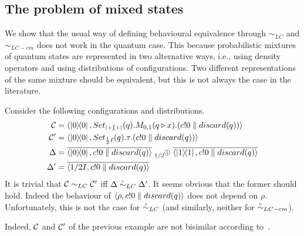 \subsection{The problem of mixed states}

We show that the usual way of defining behavioural equivalence through $\sim_{LC}$ and $\sim_{LC-cm}$ does not work in the quantum case.
This because probabilistic mixtures of quantum states are represented in two alternative ways, i.e., using density operators and using distributions of configurations.
Two different representations of the same mixture should be equivalent, but this is not always the case in the literature.

\begin{example}
	Consider the following configurations and distributions.
	\begin{align*}
		\conf &= \confw{\ketbra{0}{0}, Set_{\ketbra{+}{+}}(q).M_{0,1}(q \triangleright x).(c!0 \parallel discard(q))}\\
		\conf' &= \confw{\ketbra{0}{0}, Set_{\frac{1}{2} I}(q).\tau.(c!0 \parallel discard(q))}\\
		\Delta &= \overline{\confw{\ketbra{0}{0}, c!0 \parallel discard(q)}} \psum{1/2} \overline{\confw{\ketbra{1}{1}, c!0 \parallel discard(q)}}\\
		\Delta' &= \overline{\confw{1/2 I, c!0 \parallel discard(q)}}
	\end{align*}
	It is trivial that $\mathcal{C} \sim_{LC} \mathcal{C}'$ iff $\Delta	\stackrel{\scriptscriptstyle \circ}{\sim}_{LC} \Delta'$.
	It seems obvious that the former should hold.
	Indeed the behaviour of $\langle\rho, c!0 \parallel discard(q)\rangle$ does not depend on $\rho$.
	Unfortunately, this is not the case for $\stackrel{\scriptscriptstyle \circ}{\sim}_{LC}$ (and similarly, neither for $\stackrel{\scriptscriptstyle \circ}{\sim}_{LC-cm}$).
\end{example}
Indeed, $\mathcal{C}$ and $\mathcal{C}'$ of the previous example are not bisimilar according to~\cite{Feng:2012, Deng:2012}.

